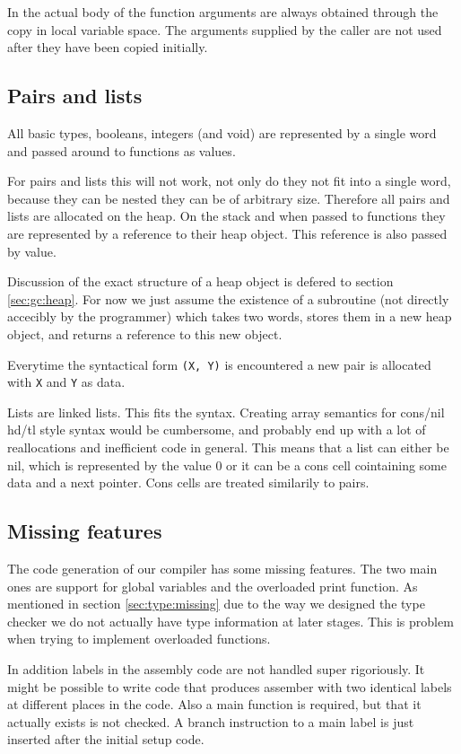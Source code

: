 \documentclass{scrartcl}
\begin{document}
In the actual body of the function arguments are always obtained
through the copy in local variable space. The arguments supplied by
the caller are not used after they have been copied initially.

\subsection{Pairs and lists}

All basic types, booleans, integers (and void)  are represented by a
single word and passed around to functions as values.

For pairs and lists this will not work, not only do they not fit into
a single word, because they can be nested they can be of arbitrary 
size. Therefore all pairs and lists are allocated on the heap. On
the stack and when passed to functions they are represented by a
reference to their heap object. This reference is also passed by value.

Discussion of the exact structure of a heap object is defered to
section \ref{sec:gc:heap}. For now we just assume the existence of 
a subroutine (not directly accecibly by the programmer) which takes
two words, stores them in a new heap object, and returns a reference
to this new object.

Everytime the syntactical form \lstinline{(X, Y)} is encountered a
new pair is allocated with \lstinline{X} and \lstinline{Y} as data.

Lists are linked lists. This fits the syntax. Creating array semantics
for cons/nil hd/tl style syntax would be cumbersome, and probably end
up with a lot of reallocations and inefficient code in general. This
means that a list can either be nil, which is represented by the value
0 or it can be a cons cell cointaining some data and a next pointer.
Cons cells are treated similarily to pairs.

\subsection{Missing features}

The code generation of our compiler has some missing features. The
two main ones are support for global variables and the overloaded print
function. As mentioned in section \ref{sec:type:missing} due to the
way we designed the type checker we do not actually have type information
at later stages. This is problem when trying to implement overloaded
functions.

In addition labels in the assembly code are not handled super rigoriously.
It might be possible to write code that produces assember with two
identical labels at different places in the code. Also a main function
is required, but that it actually exists is not checked. A branch
instruction to a main label is just inserted after the initial setup
code.
\end{document}
